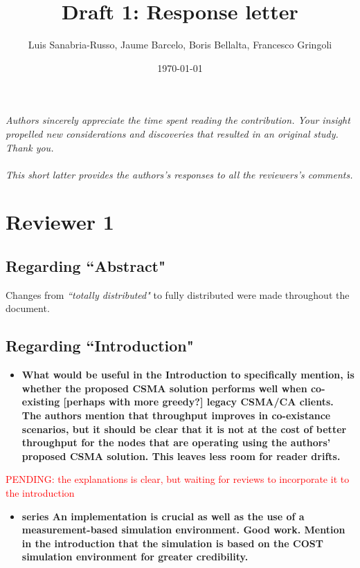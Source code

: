\documentclass[]{article}
\begin{document}
\title{Draft 1: Response letter}
  \author{Luis Sanabria-Russo, Jaume Barcelo, Boris Bellalta, Francesco Gringoli}

\date{\today}
\maketitle
\emph{Authors sincerely appreciate the time spent reading the contribution. Your insight propelled new considerations and discoveries that resulted in an original study. Thank you. \\\\This short latter provides the authors's responses to all the reviewers's comments.}

\section{Reviewer 1}
	\subsection{Regarding ``Abstract"}
		Changes from \emph{``totally distributed"} to fully distributed were made throughout the document.
	
	\subsection{Regarding ``Introduction"}
		\begin{itemize}
			\item {\bfseries What would be useful in the Introduction to specifically mention, is whether the proposed CSMA solution performs well when co-existing [perhaps with more greedy?] legacy CSMA/CA clients. The authors mention that throughput improves in co-existance scenarios, but it should be clear that it is not at the cost of better throughput for the nodes that are operating using the authors' proposed CSMA solution. This leaves less room for reader drifts.}
		\end{itemize}
		
		\textcolor{red}{PENDING: the explanations is clear, but waiting for reviews to incorporate it to the introduction}
		
		\begin{itemize}
			\item {\bf series An implementation is crucial as well as the use of a measurement-based simulation environment. Good work. Mention in the introduction that the simulation is based on the COST simulation environment for greater credibility.}
		\end{itemize}
		
\end{document}
